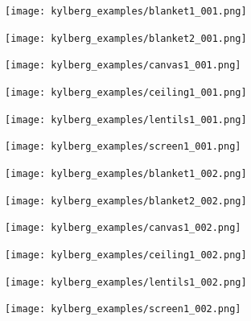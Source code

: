 \begin{figure}[h!]
\begin{subfigure}{.15\textwidth}
  \centering
  \texttt{[image: kylberg\_examples/blanket1\_001.png]}
\end{subfigure}%
\begin{subfigure}{.15\textwidth}
  \centering
  \texttt{[image: kylberg\_examples/blanket2\_001.png]}
\end{subfigure}
\begin{subfigure}{.15\textwidth}
  \centering
  \texttt{[image: kylberg\_examples/canvas1\_001.png]}
\end{subfigure}
\begin{subfigure}{.15\textwidth}
  \centering
  \texttt{[image: kylberg\_examples/ceiling1\_001.png]}
\end{subfigure}%
\begin{subfigure}{.15\textwidth}
  \centering
  \texttt{[image: kylberg\_examples/lentils1\_001.png]}
\end{subfigure}
\begin{subfigure}{.15\textwidth}
  \centering
  \texttt{[image: kylberg\_examples/screen1\_001.png]}
\end{subfigure}

\begin{subfigure}{.15\textwidth}
  \centering
  \texttt{[image: kylberg\_examples/blanket1\_002.png]}
\end{subfigure}%
\begin{subfigure}{.15\textwidth}
  \centering
  \texttt{[image: kylberg\_examples/blanket2\_002.png]}
\end{subfigure}
\begin{subfigure}{.15\textwidth}
  \centering
  \texttt{[image: kylberg\_examples/canvas1\_002.png]}
\end{subfigure}
\begin{subfigure}{.15\textwidth}
  \centering
  \texttt{[image: kylberg\_examples/ceiling1\_002.png]}
\end{subfigure}%
\begin{subfigure}{.15\textwidth}
  \centering
  \texttt{[image: kylberg\_examples/lentils1\_002.png]}
\end{subfigure}
\begin{subfigure}{.15\textwidth}
  \centering
  \texttt{[image: kylberg\_examples/screen1\_002.png]}
\end{subfigure}


\end{figure}

